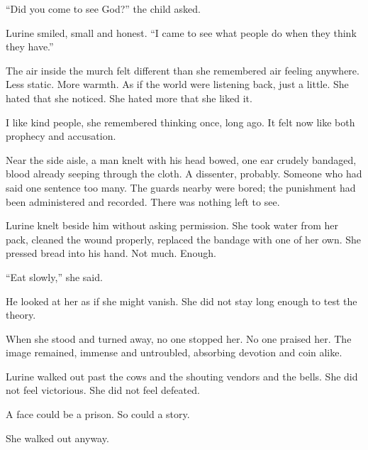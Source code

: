 ``Did you come to see God?'' the child asked.

Lurine smiled, small and honest. ``I came to see what people do when they think they have.''

The air inside the murch felt different than she remembered air feeling anywhere. Less static. More warmth. As if the world were listening back, just a little. She hated that she noticed. She hated more that she liked it.

I like kind people, she remembered thinking once, long ago.
It felt now like both prophecy and accusation.

Near the side aisle, a man knelt with his head bowed, one ear crudely bandaged, blood already seeping through the cloth. A dissenter, probably. Someone who had said one sentence too many. The guards nearby were bored; the punishment had been administered and recorded. There was nothing left to see.

Lurine knelt beside him without asking permission. She took water from her pack, cleaned the wound properly, replaced the bandage with one of her own. She pressed bread into his hand. Not much. Enough.

``Eat slowly,'' she said.

He looked at her as if she might vanish. She did not stay long enough to test the theory.

When she stood and turned away, no one stopped her. No one praised her. The image remained, immense and untroubled, absorbing devotion and coin alike.

Lurine walked out past the cows and the shouting vendors and the bells. She did not feel victorious. She did not feel defeated.

A face could be a prison.
So could a story.

She walked out anyway.

